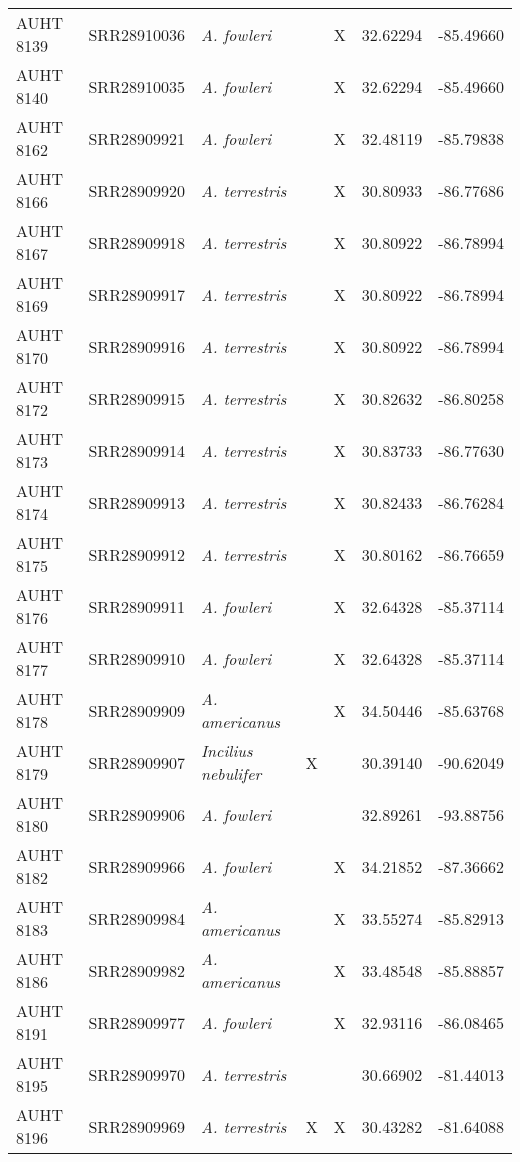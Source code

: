 \begin{longtable}{ lllllll }
AUHT 8139 & SRR28910036 & \textit{A. fowleri} &  & X & 32.62294 & -85.49660 \\ 
AUHT 8140 & SRR28910035 & \textit{A. fowleri} &  & X & 32.62294 & -85.49660 \\ 
AUHT 8162 & SRR28909921 & \textit{A. fowleri} &  & X & 32.48119 & -85.79838 \\ 
AUHT 8166 & SRR28909920 & \textit{A. terrestris} &  & X & 30.80933 & -86.77686 \\ 
AUHT 8167 & SRR28909918 & \textit{A. terrestris} &  & X & 30.80922 & -86.78994 \\ 
AUHT 8169 & SRR28909917 & \textit{A. terrestris} &  & X & 30.80922 & -86.78994 \\ 
AUHT 8170 & SRR28909916 & \textit{A. terrestris} &  & X & 30.80922 & -86.78994 \\ 
AUHT 8172 & SRR28909915 & \textit{A. terrestris} &  & X & 30.82632 & -86.80258 \\ 
AUHT 8173 & SRR28909914 & \textit{A. terrestris} &  & X & 30.83733 & -86.77630 \\ 
AUHT 8174 & SRR28909913 & \textit{A. terrestris} &  & X & 30.82433 & -86.76284 \\ 
AUHT 8175 & SRR28909912 & \textit{A. terrestris} &  & X & 30.80162 & -86.76659 \\ 
AUHT 8176 & SRR28909911 & \textit{A. fowleri} &  & X & 32.64328 & -85.37114 \\ 
AUHT 8177 & SRR28909910 & \textit{A. fowleri} &  & X & 32.64328 & -85.37114 \\ 
AUHT 8178 & SRR28909909 & \textit{A. americanus} &  & X & 34.50446 & -85.63768 \\ 
AUHT 8179 & SRR28909907 & \textit{Incilius nebulifer} & X &  & 30.39140 & -90.62049 \\ 
AUHT 8180 & SRR28909906 & \textit{A. fowleri} &  &  & 32.89261 & -93.88756 \\ 
AUHT 8182 & SRR28909966 & \textit{A. fowleri} &  & X & 34.21852 & -87.36662 \\ 
AUHT 8183 & SRR28909984 & \textit{A. americanus} &  & X & 33.55274 & -85.82913 \\ 
AUHT 8186 & SRR28909982 & \textit{A. americanus} &  & X & 33.48548 & -85.88857 \\ 
AUHT 8191 & SRR28909977 & \textit{A. fowleri} &  & X & 32.93116 & -86.08465 \\ 
AUHT 8195 & SRR28909970 & \textit{A. terrestris} &  &  & 30.66902 & -81.44013 \\ 
AUHT 8196 & SRR28909969 & \textit{A. terrestris} & X & X & 30.43282 & -81.64088 \\ 

\end{longtable}
